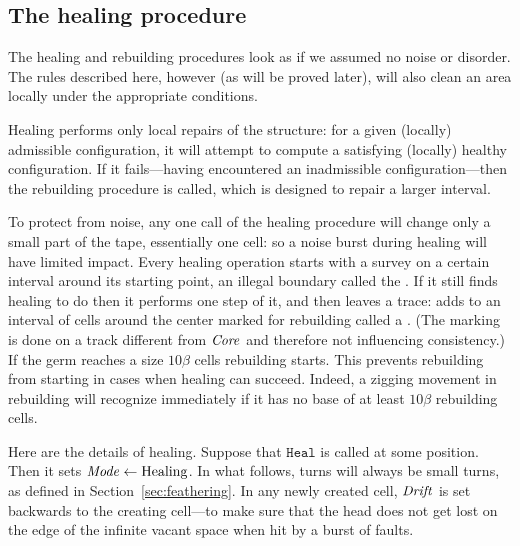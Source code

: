 \documentclass[11pt]{memoir}
\theoremstyle{definition} %
\newcommand{\fld}[1]{\ensuremath{\textit{#1\/}}}
\newcommand{\rul}[1]{\ensuremath{\texttt{#1}}}
\newcommand{\Core}{\fld{Core}}
\newcommand{\Drift}{\fld{Drift}}
\newcommand{\Mode}{\fld{Mode}}
\newcommand{\Healing}{\mathrm{Healing}}
\newcommand{\rHeal}{\rul{Heal}}
\begin{document}
\subsection{The healing procedure}\label{sec:healing-proc}

The healing and rebuilding procedures look as if we assumed no noise or disorder.
The rules described here, however (as will be proved later), will also clean an area locally under the 
appropriate conditions.

Healing performs only local repairs of the structure: for a given (locally) admissible configuration,
it will attempt to compute a satisfying (locally) healthy configuration.
If it fails---having encountered an inadmissible configuration---then
the rebuilding procedure is called, which is designed to repair a larger interval.

To protect from noise, any one call of the healing procedure will change only 
a small part of the tape, essentially one cell: so a noise burst during healing
will have limited impact.
Every healing operation starts with a survey on a certain interval around its starting point,
an illegal boundary called the .
If it still finds healing to do then it performs one step of it, and then leaves a trace:
adds to an interval of cells around the center marked for rebuilding called a .
(The marking is done on a track different from \( \Core \) and therefore not influencing consistency.)
If the germ reaches a size \( 10\beta \) cells rebuilding starts.
This prevents rebuilding from starting in cases when healing can succeed.
Indeed, a zigging movement in rebuilding will recognize immediately if it has
no base of at least \( 10\beta \) rebuilding cells.


Here are the details of healing.
Suppose that \( \rHeal \) is called at some position.
Then it sets \( \Mode\gets\Healing \).
In what follows, turns will always be small turns, as defined in Section~\ref{sec:feathering}. 
In any newly created cell, 
\( \Drift \) is set backwards to the creating cell---to make sure that the head does not get
lost on the edge of the infinite vacant space when hit by a burst of faults.
\end{document}
